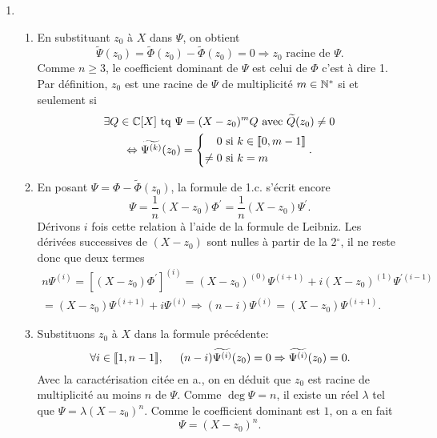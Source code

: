 \begin{enumerate}
\item 
\begin{enumerate}
\item En substituant $z_0$ à $X$ dans $\Psi$, on obtient
\[
 \widetilde{\Psi}(z_0) = \widetilde{\Phi}(z_0) - \widetilde{\Phi}(z_0) = 0 \Rightarrow z_0 \text{ racine de }\Psi.
\]
Comme $n\geq 3$, le coefficient dominant de $\Psi$ est celui de $\Phi$ c'est à dire 1.\newline
Par définition, $z_0$ est une racine de $\Psi$ de multiplicité $m\in \mathbb{N}^*$ si et seulement si
\begin{multline*}
 \exists Q\in \mathbb{C}[X] \text{ tq } \Psi = (X-z_0)^m Q\text{ avec } \widetilde{Q}(z_0)\neq 0 \\
 \Leftrightarrow
 \widetilde{\Psi^{(k)}}(z_0)=
 \left\lbrace 
 \begin{aligned}
  0 &\text{ si } k\in \llbracket 0, m-1\rrbracket \\ \neq 0 &\text{ si } k = m
 \end{aligned}
\right. .
\end{multline*}

\item  En posant $\Psi =\Phi -\widetilde{\Phi }(z_{0})$, la formule de 1.c. s'\'{e}crit encore 
\[
\Psi =\frac{1}{n}(X-z_{0})\Phi ^{\prime }=\frac{1}{n}(X-z_{0})\Psi ^{\prime}.
\]
D\'{e}rivons $i$ fois cette relation \`{a} l'aide de la formule de Leibniz. Les d\'{e}riv\'{e}es successives de $(X-z_{0})$ sont nulles \`{a} partir de la 2${{}^{\circ }}$, il ne reste donc que deux termes
\begin{multline*}
n \Psi ^{(i)} = \left[ (X-z_{0})\Phi ^{\prime }\right] ^{(i)}
 =  (X-z_{0})^{(0)}\Psi ^{(i+1)} + i(X-z_{0})^{(1)}\Psi ^{\prime(i-1)} \\
 =  (X-z_{0})\Psi ^{(i+1)} + i\Psi ^{(i)} \Rightarrow (n -i) \Psi ^{(i)} = (X-z_{0})\Psi ^{(i+1)}.
\end{multline*}

\item  Substituons $z_0$ à $X$ dans la formule pr\'{e}c\'{e}dente:
\[
\forall i \in \llbracket 1, n-1\rrbracket, \hspace{0.5cm} (n-i)\widetilde{\Psi ^{(i)}}(z_{0}) = 0 \Rightarrow \widetilde{\Psi ^{(i)}}(z_{0}) = 0. 
\]
Avec la caractérisation citée en a., on en d\'{e}duit que $z_{0}$ est racine de multiplicit\'{e} au moins $n$ de $\Psi $. Comme $\deg \Psi =n$, il existe un r\'{e}el $\lambda $ tel que $\Psi =\lambda (X-z_{0})^{n}$. Comme le coefficient dominant est $1$, on a en fait
\[
\Psi =(X-z_{0})^{n}. 
\]
\end{enumerate}


\end{enumerate}

